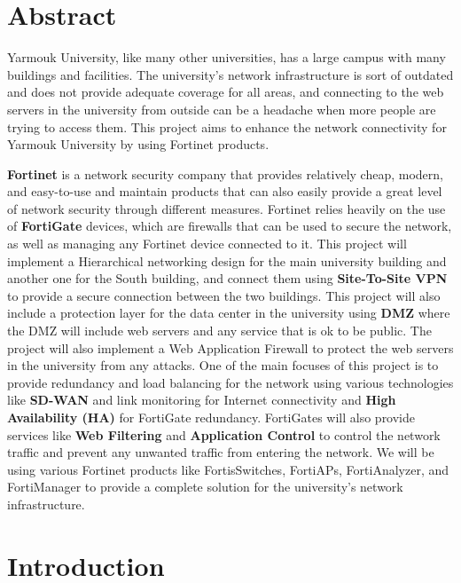 \documentclass[12pt]{report}
\begin{document}
\newpage
\tableofcontents
\newpage
\listoftables
\newpage
\listoffigures

\newpage
\chapter*{Abstract}
Yarmouk University, like many other universities, 
has a large campus with many buildings and facilities. 
The university's network infrastructure is sort of outdated and does not provide 
adequate coverage for all areas, and connecting to the web servers in the university from outside can 
be a headache when more people are trying to access them.
This project aims to enhance the network connectivity for Yarmouk University 
by using Fortinet products. 

\textbf{Fortinet} is a network security company that provides relatively cheap, modern, and easy-to-use and maintain products that can also easily provide a great level of network security through different measures.
Fortinet relies heavily on the use of \textbf{FortiGate} devices, which are firewalls that can be used to secure the network, as well as managing any Fortinet device connected to it.
This project will implement a Hierarchical networking design for the main university building and another one for the South building, and connect them using \textbf{Site-To-Site VPN} to provide a secure connection between the two buildings.
This project will also include a protection layer for the data center in the university using \textbf{DMZ} where the DMZ will include web servers and any service that is ok to be public.
The project will also implement a Web Application Firewall to protect the web servers in the university from any attacks.
One of the main focuses of this project is to provide redundancy and load balancing for the network using 
various technologies like \textbf{SD-WAN} and link monitoring for Internet connectivity and \textbf{High Availability (HA)} for FortiGate redundancy.
FortiGates will also provide services like \textbf{Web Filtering} and \textbf{Application Control} to control the network traffic and prevent any unwanted traffic from entering the network.
We will be using various Fortinet products like FortisSwitches, FortiAPs, FortiAnalyzer, and FortiManager to provide a complete solution for the university's network infrastructure.

\clearpage
{}
\chapter{Introduction}
\end{document}
